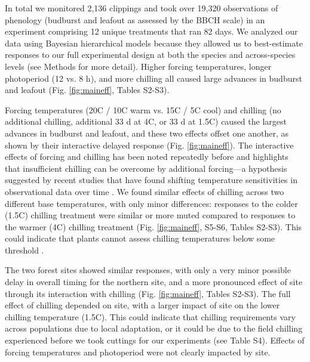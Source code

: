 \documentclass[11pt]{article}
\begin{document}
In total we monitored 2,136 clippings and took over 19,320 observations of phenology (budburst and leafout as assessed by the BBCH scale) in an experiment comprising 12 unique treatments that ran 82 days. We analyzed our data using Bayesian hierarchical models because they allowed us to best-estimate responses to our full experimental design at both the species and across-species levels (see Methods for more detail). Higher forcing temperatures, longer photoperiod (12 vs. 8 h), and more chilling all caused large advances in budburst and leafout (Fig. \ref{fig:maineff}, Tables S2-S3).

Forcing temperatures (20\degree C / 10\degree C warm vs. 15\degree C / 5\degree C cool) and chilling (no additional chilling,  additional 33 d at 4\degree C, or 33 d at 1.5\degree C) caused the largest advances in budburst and leafout, and these two effects offset one another, as shown by their interactive delayed response (Fig. \ref{fig:maineff}). The interactive effects of forcing and chilling has been noted repeatedly before \citep[e.g.,][]{Heide:1993b,Caffarra:2011aa} and highlights that insufficient chilling can be overcome by additional forcing---a hypothesis suggested by recent studies that have found shifting temperature sensitivities in observational data over time \citep{yu2010,fu2015}. We found similar effects of chilling across two different base temperatures, with only minor differences: responses to the colder (1.5\degree C) chilling treatment were similar or more muted compared to responses to the warmer  (4\degree C) chilling treatment (Fig. \ref{fig:maineff}, S5-S6, Tables S2-S3). This could indicate that plants cannot assess chilling temperatures below some threshold \citep{coville1920,Harrington:2010,guy2014}. 

The two forest sites showed similar responses, with only a very minor possible delay in overall timing for the northern site, and a more pronounced effect of site through its interaction with chilling (Fig. \ref{fig:maineff}, Tables S2-S3). The full effect of chilling depended on site, with a larger impact of site on the lower chilling temperature (1.5\degree C). This could indicate that chilling requirements vary across populations due to local adaptation, or it could be due to the field chilling experienced before we took cuttings for our experiments (see Table S4). Effects of forcing temperatures and photoperiod were not clearly impacted by site. 
\end{document}
